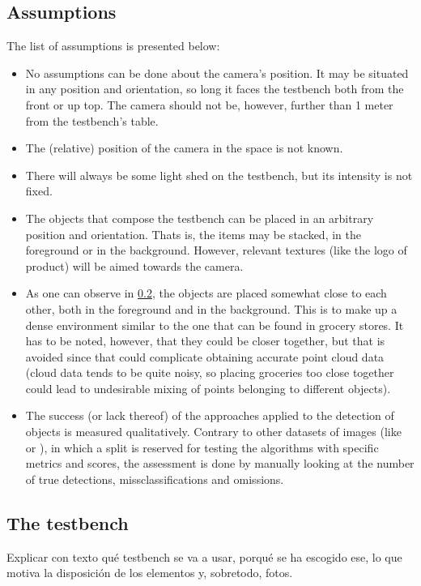 \documentclass[../main.tex]{subfiles}
\begin{document}
\subsection{Assumptions}
The list of assumptions is presented below:
\begin{itemize}
    \item No assumptions can be done about the camera's position. It may be situated in any position and orientation, so long it faces the testbench both from the front or up top. The camera should not be, however, further than 1 meter from the testbench's table.
    \item The (relative) position of the camera in the space is not known.
    \item There will always be some light shed on the testbench, but its intensity is not fixed.
    \item The objects that compose the testbench can be placed in an arbitrary position and orientation. Thats is, the items may be stacked, in the foreground or in the background. However, relevant textures (like the logo of product) will be aimed towards the camera.
    \item As one can observe in \ref{sec:the_testbench}, the objects are placed somewhat close to each other, both in the foreground and in the background. This is to make up a dense environment similar to the one that can be found in grocery stores. It has to be noted, however, that they could be closer together, but that is avoided since that could complicate obtaining accurate point cloud data (cloud data tends to be quite noisy, so placing groceries too close together could lead to undesirable mixing of points belonging to different objects).
    \item The success (or lack thereof) of the approaches applied to the detection of objects is measured qualitatively. Contrary to other datasets of images (like \cite{freiburg_dataset} or \cite{rpc_dataset}), in which a split is reserved for testing the algorithms with specific metrics and scores, the assessment is done by manually looking at the number of true detections, missclassifications and omissions.
\end{itemize}

\subsection{The testbench} \label{sec:the_testbench}
Explicar con texto qué testbench se va a usar, porqué se ha escogido ese, lo que motiva la disposición de los elementos y, sobretodo, fotos.
\end{document}
